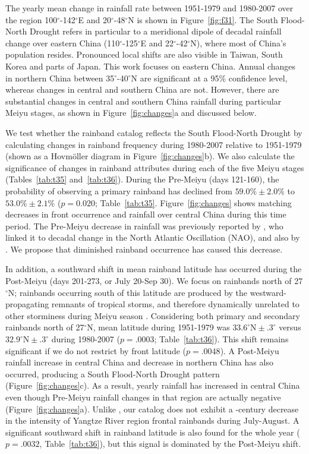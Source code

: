 \documentclass{ametsoc}
\begin{document}
	The yearly mean change in rainfall rate between 1951-1979 and 1980-2007 over the region 100$^{\circ}$-142$^{\circ}$E and 20$^{\circ}$-48$^{\circ}$N is shown in Figure~\ref{fig:f31}. The South Flood-North Drought refers in particular to a meridional dipole of decadal rainfall change over eastern China (110$^{\circ}$-125$^{\circ}$E and 22$^{\circ}$-42$^{\circ}$N), where most of China's population resides. Pronounced local shifts are also visible in Taiwan, South Korea and parts of Japan. This work focuses on eastern China. Annual changes in northern China between 35$^{\circ}$-40$^{\circ}$N are significant at a 95\% confidence level, whereas changes in central and southern China are not. However, there are substantial changes in central and southern China rainfall during particular Meiyu stages, as shown in Figure~\ref{fig:changes}a and discussed below.
		
	We test whether the rainband catalog reflects the South Flood-North Drought by calculating changes in rainband frequency during 1980-2007 relative to 1951-1979 (shown as a Hovm\"oller diagram in Figure~\ref{fig:changes}b). We also calculate the significance of changes in rainband attributes during each of the five Meiyu stages (Tables~\ref{tab:t35} and~\ref{tab:t36}). During the Pre-Meiyu (days 121-160), the probability of observing a primary rainband has declined from $59.0\% \pm 2.0\%$ to $53.0\% \pm 2.1\%$ ($p=0.020$; Table~\ref{tab:t35}. Figure~\ref{fig:changes} shows matching decreases in front occurrence and rainfall over central China during this time period. The Pre-Meiyu decrease in rainfall was previously reported by \citet{Xin2006}, who linked it to decadal change in the North Atlantic Oscillation (NAO), and also by \citet{Wang2009}. We propose that diminished rainband occurrence has caused this decrease.
		
	In addition, a southward shift in mean rainband latitude has occurred during the Post-Meiyu (days 201-273, or July 20-Sep 30). We focus on rainbands north of 27$^{\circ}$N; rainbands occurring south of this latitude are produced by the westward-propagating remnants of tropical storms, and therefore dynamically unrelated to other storminess during Meiyu season \citep{Day2015}. Considering both primary and secondary rainbands north of 27$^{\circ}$N, mean latitude during 1951-1979 was $33.6^\circ \textrm{N} \pm .3^\circ$ versus $32.9^\circ \textrm{N} \pm .3^\circ$ during 1980-2007 ($p=.0003$; Table~\ref{tab:t36}). This shift remains significant if we do not restrict by front latitude ($p=.0048$). A Post-Meiyu rainfall increase in central China and decrease in northern China has also occurred, producing a South Flood-North Drought pattern (Figure~\ref{fig:changes}c). As a result, yearly rainfall has increased in central China even though Pre-Meiyu rainfall changes in that region are actually negative (Figure~\ref{fig:changes}a). Unlike \citet{Yu2010}, our catalog does not exhibit a -century decrease in the intensity of Yangtze River region frontal rainbands during July-August. A significant southward shift in rainband latitude is also found for the whole year ($p=.0032$, Table~\ref{tab:t36}), but this signal is dominated by the Post-Meiyu shift.
	
\end{document}
